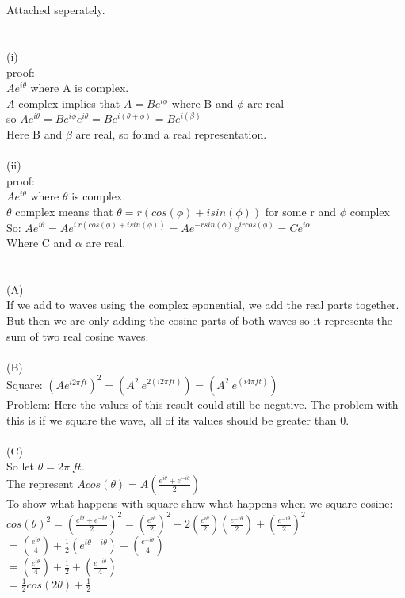 \documentclass[11pt,leqno,fleqn]{article}
\begin{document}
\section{}
 Attached seperately.\\
\section{}
(i)\\
proof:\\
$Ae^{i \theta}$ where A is complex.\\
$A$ complex implies that $A = Be^{i \phi}$ where B and $\phi$ are real\\
so $Ae^{i \theta} = Be^{i \phi }e^{i \theta} = Be^{i (\theta + \phi)} =  Be^{i (\beta)} $\\
Here B and $\beta$ are real, so found a real representation.\\
\\
(ii)\\
proof:\\
$Ae^{i \theta}$ where $\theta$ is complex.\\
$\theta$ complex means that $\theta = r(cos(\phi) + i sin(\phi))$ for some r and $\phi$ complex\\
So: $Ae^{i \theta} = Ae^{i \ r(cos(\phi) + i sin(\phi))} = A e^{-  r sin(\phi)} e^{i r cos(\phi)} = Ce^{i \alpha} $\\
Where C and $\alpha$ are real.
\\
\newpage
\section{}
(A)\\
If we add to waves using the complex eponential, we add the real parts together. But then we are only adding the cosine parts of both waves so it represents the sum of two real cosine waves.\\
\\
(B)\\
Square: $(Ae^{i 2 \pi f t})^2 = (A^2 \ e^{2(i 2 \pi f t)})  = (A^2 \ e^{(i 4 \pi f t)})  $\\
Problem: Here the values of this result could still be negative. The problem with this is if we square the wave, all of its values should be greater than 0.\\
\\
(C)\\
So let $\theta =  2 \pi \ f t$.\\
The represent $A cos(\theta) = A (\frac{e^{i \theta} + e^{-i \theta}}2{})$\\
To show what happens with square show what happens when we square cosine:\\
$cos(\theta)^2 = (\frac{e^{i \theta} + e^{-i \theta}}{2})^2 = (\frac{e^{i \theta}}{2})^2 + 2 (\frac{e^{i \theta}}{2}) (\frac{e^{-i \theta}}{2}) + (\frac{e^{- i \theta}}{2})^2$\\
$=  (\frac{e^{i \theta}}{4}) + \frac{1}{2} (e^{i \theta - i \theta}) + (\frac{e^{- i \theta}}{4})$\\
$=  (\frac{e^{i \theta}}{4}) + \frac{1}{2} + (\frac{e^{- i \theta}}{4})$\\
$ = \frac{1}{2} cos(2 \theta) + \frac{1}{2}$
\\
\end{document}
